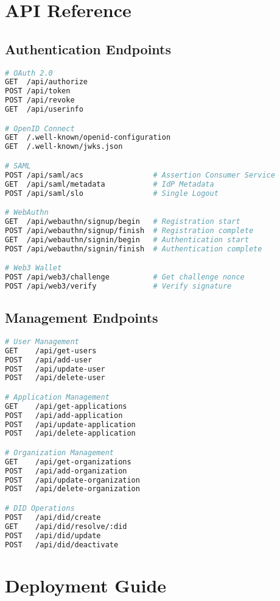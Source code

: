 \documentclass[11pt,a4paper]{article}
\begin{document}
\section{API Reference}

\subsection{Authentication Endpoints}

\begin{lstlisting}[language=bash]
# OAuth 2.0
GET  /api/authorize
POST /api/token
POST /api/revoke
GET  /api/userinfo

# OpenID Connect
GET  /.well-known/openid-configuration
GET  /.well-known/jwks.json

# SAML
POST /api/saml/acs                # Assertion Consumer Service
GET  /api/saml/metadata           # IdP Metadata
POST /api/saml/slo                # Single Logout

# WebAuthn
GET  /api/webauthn/signup/begin   # Registration start
POST /api/webauthn/signup/finish  # Registration complete
GET  /api/webauthn/signin/begin   # Authentication start
POST /api/webauthn/signin/finish  # Authentication complete

# Web3 Wallet
POST /api/web3/challenge          # Get challenge nonce
POST /api/web3/verify             # Verify signature
\end{lstlisting}

\subsection{Management Endpoints}

\begin{lstlisting}[language=bash]
# User Management
GET    /api/get-users
POST   /api/add-user
POST   /api/update-user
POST   /api/delete-user

# Application Management
GET    /api/get-applications
POST   /api/add-application
POST   /api/update-application
POST   /api/delete-application

# Organization Management
GET    /api/get-organizations
POST   /api/add-organization
POST   /api/update-organization
POST   /api/delete-organization

# DID Operations
POST   /api/did/create
GET    /api/did/resolve/:did
POST   /api/did/update
POST   /api/did/deactivate
\end{lstlisting}

\section{Deployment Guide}
\end{document}
